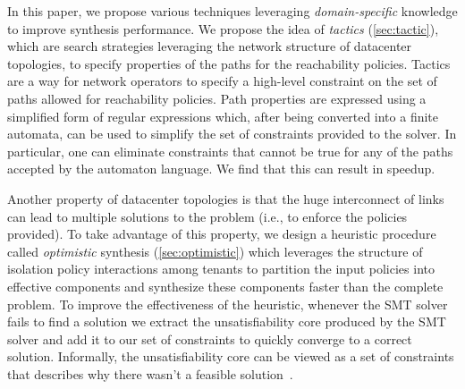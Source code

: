 In this paper, we propose various techniques leveraging
\emph{domain-specific} knowledge to improve synthesis performance. We
propose the idea of \emph{tactics} (\cref{sec:tactic}), which are
search strategies leveraging the network structure of datacenter
topologies, to specify properties of the paths for the reachability
policies.  Tactics are a way for network operators to specify a
high-level constraint on the set of paths allowed for reachability
policies.  Path properties are expressed using a simplified form of
regular expressions which, after being converted into a finite
automata, can be used to simplify the set of constraints provided to
the solver.  In particular, one can eliminate constraints that cannot
be true for any of the paths accepted by the automaton language. We
find that this can result in  speedup.  


Another property of datacenter topologies is that the huge
interconnect of links can lead to multiple solutions to the problem
(i.e., to enforce the policies provided).  To take advantage of this
property, we design a heuristic procedure called \emph{optimistic}
synthesis (\cref{sec:optimistic}) which leverages the structure of
isolation policy interactions among tenants to partition the input
policies into effective components and synthesize these components
faster than the complete problem. To improve the effectiveness of the
heuristic, whenever the SMT solver fails to find a solution we extract
the unsatisfiability core produced by the SMT solver and 
add it to our set of constraints to quickly converge to a correct solution.
Informally, the unsatisfiability core can be viewed
as a set of constraints that describes why there wasn't a feasible solution~\cite{}. 

